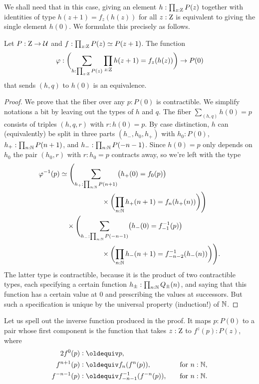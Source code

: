 \documentclass[a4paper,12pt]{amsart}
\begin{document}
We shall need that in this case, giving an element $h:\prod_{z:\mathrm{Z}}P(z)$
together with identities of type $h(z+1) = f_z(h(z))$ for all $z:\mathrm{Z}$
is equivalent to giving the single element $h(0)$.
We formulate this precisely as follows.

\begin{theorem}\label{thm:integers-univ-symm}
  Let $P : \mathrm{Z} \to \mathcal{U}$ and $f : \prod_{z:\mathrm{Z}}P(z) \simeq P(z+1)$. The function
  \[
    \varphi : \biggl(\sum_{h:\prod_{z:\mathrm{Z}}P(z)}\prod_{z:\mathrm{Z}}h(z+1) = f_z(h(z))\biggr) \to P(0)
  \]
  that sends $(h,q)$ to $h(0)$ is an equivalence.
\end{theorem}
\begin{proof}
  We prove that the fiber over any $p : P(0)$ is contractible.
  We simplify notations a bit by leaving out the types of $h$ and $q$.
  The fiber $\sum_{(h,q)} h(0)=p$ consists of triples $(h,q,r)$ with $r : h(0) = p$.
  By case distinction, $h$ can (equivalently) be split in three parts $(h_-,h_0,h_+)$
  with $h_0 : P(0)$, $h_+ : \prod_{n:\mathbb{N}}P(n+1)$,  and $h_- : \prod_{n:\mathbb{N}} P(-n-1)$. 
  Since $h(0)=p$ only depends on $h_0$ the pair $(h_0,r)$ with  $r : h_0 = p$
  contracts away, so we're left with the type
  \begin{align*}
    \varphi^{-1}(p)
    &\simeq
      \Biggl(\sum_{h_+ : \prod_{n:\mathbb{N}}P(n+1)}
      \bigl(h_+(0) = f_0(p)\bigr) \\
    &\qquad\qquad\qquad
      \times \biggl(\prod_{n:\mathbb{N}}h_+(n+1) = f_n(h_+(n))\biggr)\Biggr) \\
    &\quad\times
      \Biggl(\sum_{h_- : \prod_{n:\mathbb{N}}P(-n-1)}
      \bigl(h_-(0) = f_{-1}^{-1}(p)\bigr) \\
    &\qquad\qquad\qquad
      \times \biggl(\prod_{n:\mathbb{N}}h_-(n+1) = f_{-n-2}^{-1}(h_-(n))\biggr)\Biggr).
  \end{align*}
  The latter type is contractible, because it is the product of two contractible types,
  each specifying a certain function $h_{\pm}:\prod_{n:\mathbb{N}}Q_{\pm}(n)$,
  and saying that this function has a certain value at $0$
  and prescribing the values at successors.
  But such a specification is unique by the universal property (induction!) of $\mathbb{N}$.
\end{proof}
Let us spell out the inverse function produced in the proof.
It maps $p : P(0)$ to a pair whose first component
is the function that takes $z:\mathrm{Z}$ to $f^z(p):P(z)$, where
\begin{alignat*}2
  f^0(p) &\defeq p, && \\
  f^{n+1}(p) &\defeq f_n(f^n(p)),&\quad&\text{for $n:\NN$,} \\
  f^{-n-1}(p) &\defeq f_{-n-1}^{-1}(f^{-n}(p)),&\quad&\text{for $n:\NN$.}
\end{alignat*}
\end{document}
